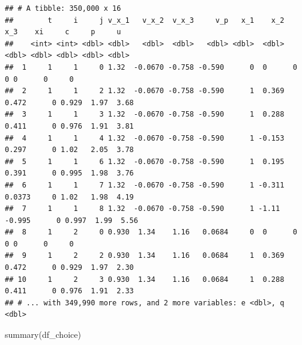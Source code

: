 \documentclass[
]{book}
\newenvironment{Shaded}{\begin{snugshade}}{\end{snugshade}}
\newcommand{\FunctionTok}[1]{\textcolor[rgb]{0.00,0.00,0.00}{#1}}
\newcommand{\NormalTok}[1]{#1}
\begin{document}
\begin{verbatim}
## # A tibble: 350,000 x 16
##        t     i     j v_x_1   v_x_2  v_x_3     v_p   x_1    x_2     x_3    xi     c     p     u
##    <int> <int> <dbl> <dbl>   <dbl>  <dbl>   <dbl> <dbl>  <dbl>   <dbl> <dbl> <dbl> <dbl> <dbl>
##  1     1     1     0 1.32  -0.0670 -0.758 -0.590      0  0      0          0 0      0     0   
##  2     1     1     2 1.32  -0.0670 -0.758 -0.590      1  0.369  0.472      0 0.929  1.97  3.68
##  3     1     1     3 1.32  -0.0670 -0.758 -0.590      1  0.288  0.411      0 0.976  1.91  3.81
##  4     1     1     4 1.32  -0.0670 -0.758 -0.590      1 -0.153  0.297      0 1.02   2.05  3.78
##  5     1     1     6 1.32  -0.0670 -0.758 -0.590      1  0.195  0.391      0 0.995  1.98  3.76
##  6     1     1     7 1.32  -0.0670 -0.758 -0.590      1 -0.311  0.0373     0 1.02   1.98  4.19
##  7     1     1     8 1.32  -0.0670 -0.758 -0.590      1 -1.11  -0.995      0 0.997  1.99  5.56
##  8     1     2     0 0.930  1.34    1.16   0.0684     0  0      0          0 0      0     0   
##  9     1     2     2 0.930  1.34    1.16   0.0684     1  0.369  0.472      0 0.929  1.97  2.30
## 10     1     2     3 0.930  1.34    1.16   0.0684     1  0.288  0.411      0 0.976  1.91  2.33
## # ... with 349,990 more rows, and 2 more variables: e <dbl>, q <dbl>
\end{verbatim}

\begin{Shaded}
\begin{Highlighting}[]
\FunctionTok{summary}\NormalTok{(df\_choice)}
\end{Highlighting}
\end{Shaded}
\end{document}
